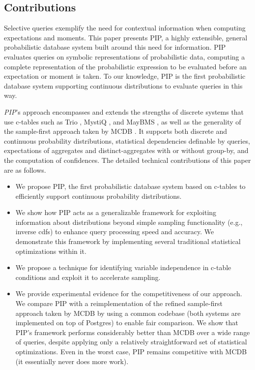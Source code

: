 \subsection{Contributions}

Selective queries exemplify the need for contextual information when computing expectations and moments.  This paper presents PIP, a highly extensible, general probabilistic database system built around this need for information.  PIP evaluates queries on symbolic representations of probabilistic data, computing a complete representation of the probabilistic expression to be evaluated before an expectation or moment is taken.  To our knowledge, PIP is the first probabilistic database system supporting continuous distributions to evaluate queries in this way.

{\em PIP}\/'s approach encompasses and extends the strengths of discrete systems that use c-tables such as Trio \cite{WidomTrio2008}, MystiQ \cite{dalvi07efficient}, and MayBMS \cite{AJKO2008}, as well as the generality of the sample-first approach taken by MCDB \cite{MCDB}.  It supports both discrete and continuous probability distributions, statistical dependencies definable by queries, expectations of aggregates and distinct-aggregates with or without group-by,  and the computation of confidences. The detailed technical contributions of this paper are as follows.

\begin{itemize}
\item We propose PIP, the first probabilistic database system based on c-tables to efficiently support continuous probability distributions.

\item We show how PIP acts as a generalizable framework for exploiting information about distributions beyond simple sampling functionality (e.g., inverse cdfs) to enhance query processing speed and accuracy.  We demonstrate this framework by implementing several traditional statistical optimizations within it.

\item We propose a technique for identifying variable independence in c-table conditions and exploit it to accelerate sampling.

\item
We provide experimental evidence for the competitiveness of our approach.  We compare PIP with a reimplementation of the refined sample-first approach taken by MCDB by using a common codebase (both systems are implemented on top of Postgres) to enable fair comparison.  We show that PIP's framework performs considerably better than MCDB over a wide range of queries, despite applying only a relatively straightforward set of statistical optimizations.  Even in the worst case, PIP remains competitive with MCDB (it essentially never does more work).

\end{itemize}

